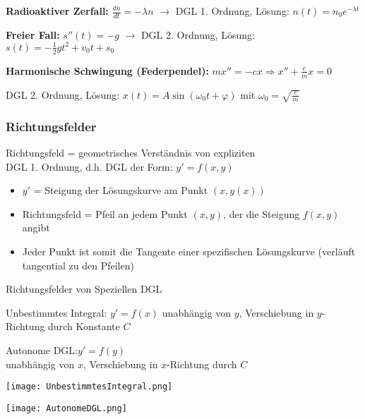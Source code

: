 \begin{example}
\textbf{Radioaktiver Zerfall:} $\frac{dn}{dt} = -\lambda n$ $\rightarrow$
DGL 1. Ordnung, Lösung: $n(t) = n_0 e^{-\lambda t}$

\textbf{Freier Fall:} $s''(t) = -g$ $\rightarrow$
DGL 2. Ordnung, Lösung: $s(t) = -\frac{1}{2}gt^2 + v_0 t + s_0$

\textbf{Harmonische Schwingung (Federpendel):} $mx'' = -cx \Rightarrow x'' + \frac{c}{m}x = 0$

DGL 2. Ordnung, Lösung: $x(t) = A \sin(\omega_0 t + \varphi)$ mit $\omega_0 = \sqrt{\frac{c}{m}}$
\end{example}




\subsubsection{Richtungsfelder}

\begin{definition}{Richtungsfeld} = geometrisches Verständnis von expliziten \\
  DGL 1. Ordnung, d.h. DGL der Form: $y'=f(x,y)$
  \begin{itemize}
    \item $y'$ = Steigung der Lösungskurve am Punkt $(x,y(x))$
    \item Richtungsfeld = Pfeil an jedem Punkt $(x,y)$, der die Steigung $f(x,y)$ angibt
    \item Jeder Punkt ist somit die Tangente einer spezifischen Lösungskurve (verläuft tangential zu den Pfeilen)
  \end{itemize}
\end{definition}

\begin{concept}{Richtungsfelder von Speziellen DGL}\\
  \begin{minipage}{0.5\linewidth}
    Unbestimmtes Integral: \(y'=f(x)\) unabhängig von \(y\), Verschiebung in \(y\)-Richtung durch Konstante \(C\)
  \end{minipage}
  \hspace{2mm}
  \begin{minipage}{0.45\linewidth}
    Autonome DGL:\(y'=f(y)\) \\ unabhängig von \(x\),
    Verschiebung in \(x\)-Richtung durch \(C\)
  \end{minipage}

  \begin{minipage}{0.5\linewidth}
    \begin{center}
      \texttt{[image: UnbestimmtesIntegral.png]}
      \end{center}
  \end{minipage}
  \begin{minipage}{0.45\linewidth}
    \begin{center}
      \texttt{[image: AutonomeDGL.png]}
      \end{center}
  \end{minipage}
\end{concept}


